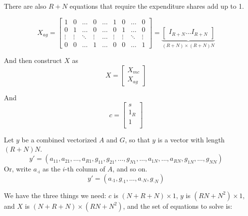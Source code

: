 \documentclass[11pt]{article}
\begin{document}
There are also $R+N$ equations that require the expenditure shares add up to 1.

\[
X_{ag} = 
\begin{bmatrix}
    1 & 0 &\dots  & 0 & \dots & 1 & 0 & \dots & 0\\
    0 & 1 &\dots  & 0 & \dots & 0 & 1 &\dots  & 0\\
    \vdots & \vdots & \ddots & \vdots & \dots & \vdots & \vdots & \ddots & \vdots \\
    0 & 0 & \dots  & 1 & \dots & 0 & 0 &\dots  & 1
\end{bmatrix} = 
\underbrace{\begin{bmatrix}
I_{R+N} \ldots I_{R+N}
\end{bmatrix}}_{(R+N) \times (R+N) N}
\]



And then construct $X$ as
\[
X = 
\begin{bmatrix}
X_{mc} \\
X_{ag}
\end{bmatrix}
\]

And 
\[
c = 
\begin{bmatrix}
s \\
1_R \\
1 \\
\end{bmatrix}
\]

Let $y$ be a combined vectorized $A$ and $G$, so that $y$ is a vector with length $(R + N) N$. 
\[ 
y' = (a_{11},a_{21},\ldots,a_{R1},g_{11},g_{21},\ldots,g_{N1},\ldots,a_{1N},\ldots,a_{RN},g_{1N},\ldots,g_{NN}) 
\]
Or, write $a_{\cdot i}$ as the $i$-th column of $A$, and so on.
\[ 
y' = (a_{\cdot 1},g_{ \cdot 1},\ldots,a_{ \cdot N},g_{ \cdot N})
\]

We have the three things we need: $c$ is $(N + R + N) \times 1$, $y$ is $(RN + N^2)\times 1$, and $X$ is $(N+R+N)\times (RN + N^2)$, and the set of equations to solve is:
\end{document}
